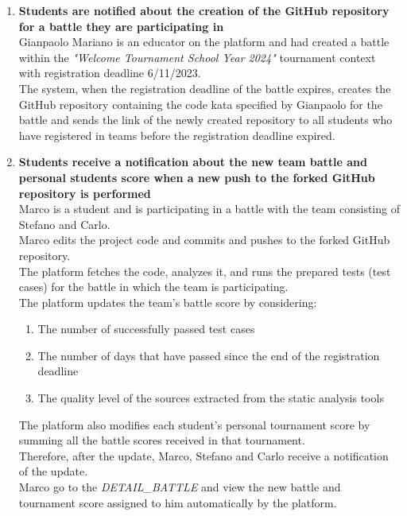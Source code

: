 \begin{enumerate}
	\item \textbf{Students are notified about the creation of the GitHub repository for a battle they are participating in}\\
	      Gianpaolo Mariano is an educator on the platform and had created a battle within the \emph{"Welcome Tournament School Year 2024"} tournament context with registration deadline 6/11/2023.\\
	      The system, when the registration deadline of the battle expires, creates the GitHub repository containing the code kata specified by Gianpaolo for the battle and sends the link of the newly created repository to all students who have registered in teams before the registration deadline expired.


	\item \textbf{Students receive a notification about the new team battle and personal students score when a new push to the forked GitHub repository is performed}\\
	      Marco is a student and is participating in a battle with the team consisting of Stefano and Carlo.\\
	      Marco edits the project code and commits and pushes to the forked GitHub repository. \\
	      The platform fetches the code, analyzes it, and runs the prepared tests (test cases) for the battle in which the team is participating.\\
	      The platform updates the team's battle score by considering:
	      \begin{enumerate}
		      \item The number of successfully passed test cases
		      \item The number of days that have passed since the end of the registration deadline
		      \item The quality level of the sources extracted from the static analysis tools
	      \end{enumerate}
	      The platform also modifies each student's personal tournament score by summing all the battle scores received in that tournament.\\
	      Therefore, after the update, Marco, Stefano and Carlo receive a notification of the update.\\
	      Marco go to the \emph{DETAIL\_BATTLE} and view the new battle and tournament score assigned to him automatically by the platform.\\






\end{enumerate}
